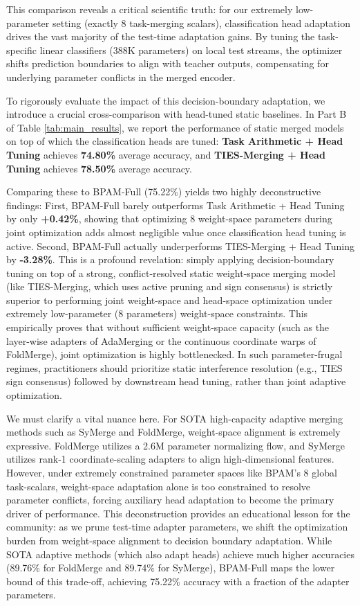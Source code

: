 This comparison reveals a critical scientific truth: for our extremely low-parameter setting (exactly 8 task-merging scalars), classification head adaptation drives the vast majority of the test-time adaptation gains. By tuning the task-specific linear classifiers (388K parameters) on local test streams, the optimizer shifts prediction boundaries to align with teacher outputs, compensating for underlying parameter conflicts in the merged encoder.

To rigorously evaluate the impact of this decision-boundary adaptation, we introduce a crucial cross-comparison with head-tuned static baselines. In Part B of Table \ref{tab:main_results}, we report the performance of static merged models on top of which the classification heads are tuned: {\bf Task Arithmetic + Head Tuning} achieves {\bf 74.80\%} average accuracy, and {\bf TIES-Merging + Head Tuning} achieves {\bf 78.50\%} average accuracy. 

Comparing these to BPAM-Full (75.22\%) yields two highly deconstructive findings:
First, BPAM-Full barely outperforms Task Arithmetic + Head Tuning by only {\bf +0.42\%}, showing that optimizing 8 weight-space parameters during joint optimization adds almost negligible value once classification head tuning is active. 
Second, BPAM-Full actually underperforms TIES-Merging + Head Tuning by {\bf -3.28\%}. This is a profound revelation: simply applying decision-boundary tuning on top of a strong, conflict-resolved static weight-space merging model (like TIES-Merging, which uses active pruning and sign consensus) is strictly superior to performing joint weight-space and head-space optimization under extremely low-parameter (8 parameters) weight-space constraints. This empirically proves that without sufficient weight-space capacity (such as the layer-wise adapters of AdaMerging or the continuous coordinate warps of FoldMerge), joint optimization is highly bottlenecked. In such parameter-frugal regimes, practitioners should prioritize static interference resolution (e.g., TIES sign consensus) followed by downstream head tuning, rather than joint adaptive optimization.

We must clarify a vital nuance here. For SOTA high-capacity adaptive merging methods such as SyMerge and FoldMerge, weight-space alignment is extremely expressive. FoldMerge utilizes a 2.6M parameter normalizing flow, and SyMerge utilizes rank-1 coordinate-scaling adapters to align high-dimensional features. However, under extremely constrained parameter spaces like BPAM's 8 global task-scalars, weight-space adaptation alone is too constrained to resolve parameter conflicts, forcing auxiliary head adaptation to become the primary driver of performance. This deconstruction provides an educational lesson for the community: as we prune test-time adapter parameters, we shift the optimization burden from weight-space alignment to decision boundary adaptation. While SOTA adaptive methods (which also adapt heads) achieve much higher accuracies (89.76\% for FoldMerge and 89.74\% for SyMerge), BPAM-Full maps the lower bound of this trade-off, achieving 75.22\% accuracy with a fraction of the adapter parameters.

